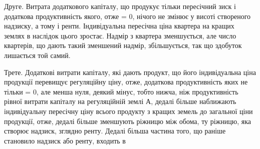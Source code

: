Друге. Витрата додаткового капіталу, що продукує тільки пересічний
зиск і додаткова продуктивність якого, отже = 0, нічого не змінює у висоті
створеного надзиску, а тому і ренти. Індивідуальна пересічна ціна квартера на
кращих землях в наслідок цього зростає. Надмір з квартера зменшується, але
число квартерів, що дають такий зменшений надмір, збільшується, так що здобуток
лишається той самий.

Трете. Додаткові витрати капіталу, які дають продукт, що його індивідуальна
ціна продукції перевищує регуляційну ціну, отже, додаткова продуктивність
яких не тільки = 0, але менша нуля, деякий мінус, тобто нижча,
ніж продуктивність рівної витрати капіталу на регуляційній землі А, дедалі
більше наближають індивідуальну пересічну ціну всього продукту з кращих
земель до загальної ціни продукції, отже, дедалі більше зменшують ріжницю
між обома, ту ріжницю, яка створює надзиск, зглядно ренту. Дедалі
більша частина того, що раніше становило надзиск або ренту, входить в
\parbreak{}  %
